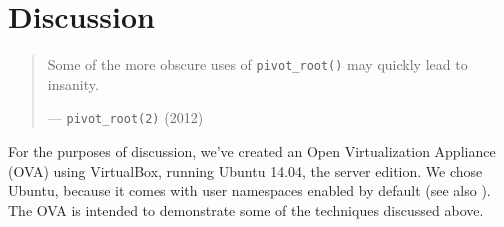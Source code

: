 
\chapter{Discussion}

\label{section:discussion}

\begin{quotation}

\footnotesize\sffamily\itshape

\begin{flushright}

Some of the more obscure uses of \texttt{pivot\_root()} may quickly lead to insanity.

\smallbreak

\upshape

--- \texttt{pivot\_root(2)} (2012)

\end{flushright}

\end{quotation}



For the purposes of discussion, we've created an Open Virtualization Appliance
(OVA) using VirtualBox, running Ubuntu 14.04, the server edition. We chose
Ubuntu, because it comes with user namespaces enabled by default (see also
). The OVA is intended to
demonstrate some of the techniques discussed above.




